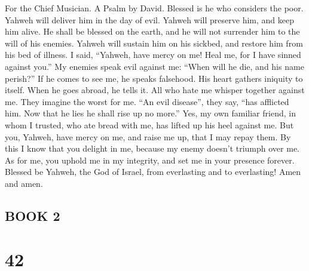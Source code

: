 For the Chief Musician. A Psalm by David.  Blessed is he
who considers the poor. Yahweh will deliver him in the day of evil.
 Yahweh will preserve him, and keep him alive. He shall be
blessed on the earth, and he will not surrender him to the will of his
enemies.  Yahweh will sustain him on his sickbed, and
restore him from his bed of illness.  I said, ``Yahweh,
have mercy on me! Heal me, for I have sinned against you.''
 My enemies speak evil against me: ``When will he die, and
his name perish?''  If he comes to see me, he speaks
falsehood. His heart gathers iniquity to itself. When he goes abroad, he
tells it.  All who hate me whisper together against me.
They imagine the worst for me.  ``An evil disease'', they
say, ``has afflicted him. Now that he lies he shall rise up no more.''
 Yes, my own familiar friend, in whom I trusted, who ate
bread with me, has lifted up his heel against me.  But
you, Yahweh, have mercy on me, and raise me up, that I may repay them.
 By this I know that you delight in me, because my enemy
doesn't triumph over me.  As for me, you uphold me in my
integrity, and set me in your presence forever.  Blessed
be Yahweh, the God of Israel, from everlasting and to everlasting! Amen
and amen.

\hypertarget{book-2}{%
\subsection{BOOK 2}\label{book-2}}

\hypertarget{section-41}{%
\section{42}\label{section-41}}


